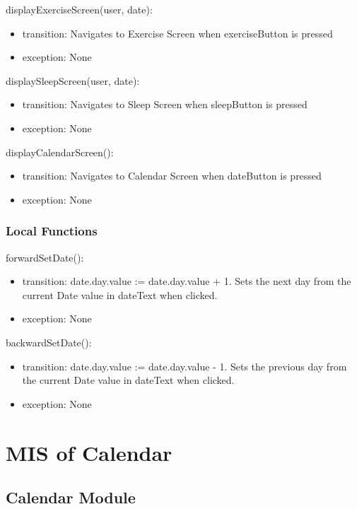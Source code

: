 \documentclass[12pt, titlepage]{article}
\begin{document}
\noindent displayExerciseScreen(user, date):
\begin{itemize}
	\item transition: Navigates to Exercise Screen when exerciseButton is pressed
	\item exception: None 
\end{itemize}

\noindent displaySleepScreen(user, date):
\begin{itemize}
	\item transition: Navigates to Sleep Screen when sleepButton is pressed
	\item exception: None 
\end{itemize}

\noindent displayCalendarScreen():
\begin{itemize}
	\item transition: Navigates to Calendar Screen when dateButton is pressed
	\item exception: None 
\end{itemize}

\subsubsection{Local Functions}

\noindent forwardSetDate():
\begin{itemize}
	\item transition: date.day.value := date.day.value + 1. Sets the next day from the current Date value in dateText when clicked.  
	\item exception: None 
\end{itemize}

\noindent backwardSetDate():
\begin{itemize}
	\item transition: date.day.value := date.day.value - 1. Sets the previous day from the current Date value in dateText when clicked. 
	\item exception: None 
\end{itemize}

\section{MIS of Calendar} \label{Module} 

\subsection{Calendar Module}
\end{document}

